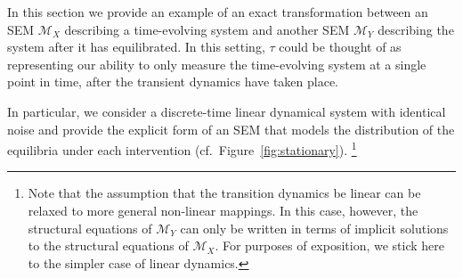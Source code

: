 In this section we provide an example of an exact transformation between an SEM $\mathcal{M}_X$ describing a time-evolving system and another SEM $\mathcal{M}_Y$ describing the system after it has equilibrated. In this setting, $\tau$ could be thought of as representing our ability to only measure the time-evolving system at a single point in time, after the transient dynamics have taken place.

In particular, we consider a discrete-time linear dynamical system with identical noise and provide the explicit form of an SEM that models the distribution of the equilibria under each intervention (cf.\ Figure~\ref{fig:stationary}).%
\footnote{Note that the assumption that the transition dynamics be linear can be relaxed to more general non-linear mappings. In this case, however, the structural equations of $\mathcal{M}_Y$ can only be written in terms of implicit solutions to the structural equations of $\mathcal{M}_X$. For purposes of exposition, we stick here to the simpler case of linear dynamics.}

